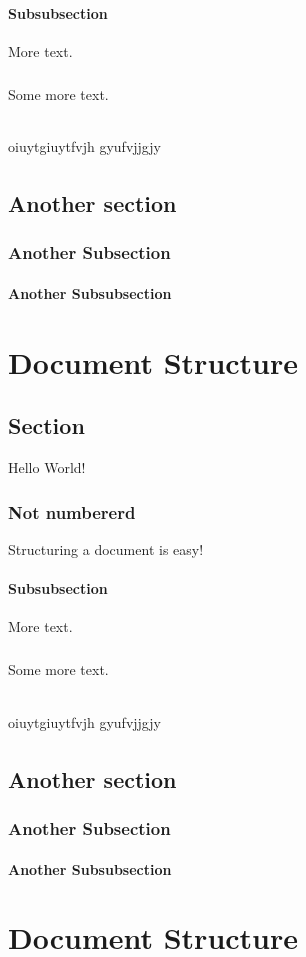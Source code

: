 \documentclass{book}
\begin{document}
	\subsubsection{Subsubsection}
	More text.
	\paragraph{}
	Some more text.
	\subparagraph{}
	oiuytgiuytfvjh gyufvjjgjy
	
	\subparagraph{}
	\lipsum[1]
	\section{Another section}
	\subsection{Another Subsection}
	\subsubsection{Another Subsubsection}
	\lipsum[1-3]\chapter{Document Structure}
	\section{Section}
	Hello World!
	\subsection*{Not numbererd}
	Structuring a document is easy!
	\subsubsection{Subsubsection}
	More text.
	\paragraph{}
	Some more text.
	\subparagraph{}
	oiuytgiuytfvjh gyufvjjgjy
	
	\subparagraph{}
	\lipsum[1]
	\section{Another section}
	\subsection{Another Subsection}
	\subsubsection{Another Subsubsection}
	\lipsum[1-3]\chapter{Document Structure}
\end{document}
